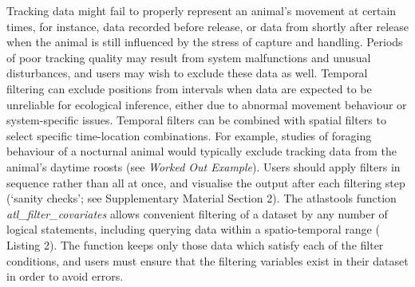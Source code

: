 \begin{refsection}[sorting=nyt]
    Tracking data might fail to properly represent an animal’s movement at certain times, for instance, data recorded before release, or data from shortly after release when the animal is still influenced by the stress of capture and handling.
    Periods of poor tracking quality may result from system malfunctions and unusual disturbances, and users may wish to exclude these data as well.
    Temporal filtering can exclude positions from intervals when data are expected to be unreliable for ecological inference, either due to abnormal movement behaviour or system-specific issues.  
    Temporal filters can be combined with spatial filters to select specific time-location combinations. 
    For example, studies of foraging behaviour of a nocturnal animal would typically exclude tracking data from the animal's daytime roosts (see \textit{Worked Out Example}).
    Users should apply filters in sequence rather than all at once, and visualise the output after each filtering step (`sanity checks'; see Supplementary Material Section 2).
    The atlastools function \textit{atl\_filter\_covariates} allows convenient filtering of a dataset by any number of logical statements, including querying data within a spatio-temporal range ({\color{red} Listing} 2).
    The function keeps only those data which satisfy each of the filter conditions, and users must ensure that the filtering variables exist in their dataset in order to avoid errors.



\end{refsection}
